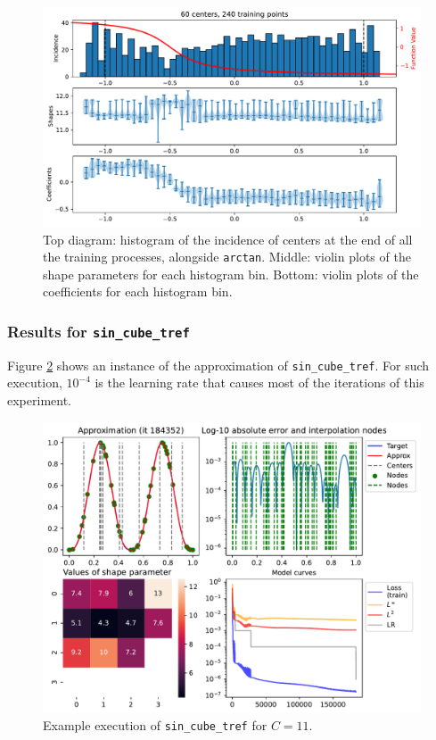 \documentclass[12pt]{report} %
\begin{document}
\begin{figure}
  \includegraphics[width=\textwidth]{imagenes/experiments/1d/statistical_1d_full_scheduler_interpolation/arctan_paper/C60-TR240-arctan_paper.pdf}
  \caption{Top diagram: histogram of the incidence of centers at the end of all the training processes, alongside \texttt{arctan}. Middle: violin plots of the shape parameters for each histogram bin. Bottom: violin plots of the coefficients for each histogram bin.}
  \label{fig:triple-plot-arctan-function}
\end{figure}


\clearpage
\subsubsection*{Results for \texttt{sin\_cube\_tref}}

Figure \ref{fig:example-execution-sin-cube-tref} shows an instance of the approximation of \texttt{sin\_cube\_tref}. For such execution, $10^{-4}$ is the learning rate that causes most of the iterations of this experiment.

\begin{figure}
  \includegraphics[width=\textwidth]{imagenes/experiments/1d/statistical_1d_full_scheduler_interpolation/sin_cube_tref/sin_cube_tref-TR44-C11-Kgaussian_kernel-Sh3.418-13-E184352.pdf}
  \caption{Example execution of \texttt{sin\_cube\_tref} for $C=11$.}
  \label{fig:example-execution-sin-cube-tref}
\end{figure}
\end{document}
